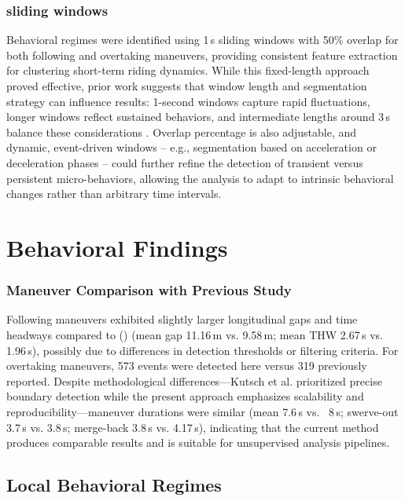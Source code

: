 \subsubsection{sliding windows}
Behavioral regimes were identified using 1 s sliding windows with 50\% overlap for both following and overtaking maneuvers, providing consistent feature extraction for clustering short-term riding dynamics. While this fixed-length approach proved effective, prior work suggests that window length and segmentation strategy can influence results: 1-second windows capture rapid fluctuations, longer windows reflect sustained behaviors, and intermediate lengths around 3 s balance these considerations \cite{li_volatility-based_2025}. Overlap percentage is also adjustable, and dynamic, event-driven windows -- e.g., segmentation based on acceleration or deceleration phases \cite{yarlagadda_exploring_2022} -- could further refine the detection of transient versus persistent micro-behaviors, allowing the analysis to adapt to intrinsic behavioral changes rather than arbitrary time intervals.



\section{Behavioral Findings}

\subsubsection{Maneuver Comparison with Previous Study}

Following maneuvers exhibited slightly larger longitudinal gaps and time headways compared to \citeauthor{kutsch_analyzing_2025} (\citeyear{kutsch_analyzing_2025}) (mean gap 11.16 m vs. 9.58 m; mean THW 2.67 s vs. 1.96 s), possibly due to differences in detection thresholds or filtering criteria. For overtaking maneuvers, 573 events were detected here versus 319 previously reported. Despite methodological differences—Kutsch et al. prioritized precise boundary detection while the present approach emphasizes scalability and reproducibility—maneuver durations were similar (mean 7.6 s vs. ~8 s; swerve-out 3.7 s vs. 3.8 s; merge-back 3.8 s vs. 4.17 s), indicating that the current method produces comparable results and is suitable for unsupervised analysis pipelines.

\subsection{Local Behavioral Regimes}


